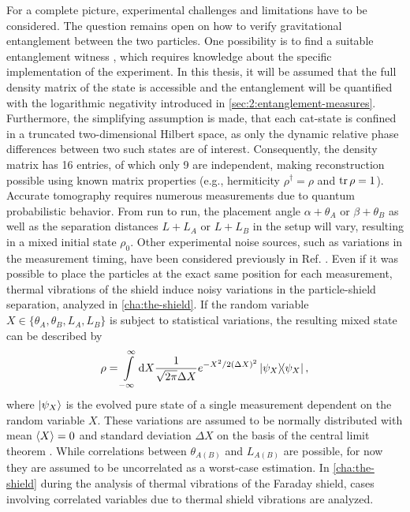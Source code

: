 For a complete picture, experimental challenges and limitations have to be considered. 
The question remains open on how to verify gravitational entanglement between the two particles.
One possibility is to find a suitable entanglement witness \cite{Bose_2017,Chevalier_2020}, which requires knowledge about the specific implementation of the experiment.
In this thesis, it will be assumed that the full density
matrix of the state is accessible and the entanglement will be quantified with the logarithmic negativity introduced in \cref{sec:2:entanglement-measures}.
Furthermore, the simplifying assumption is made, that each cat-state is confined in a truncated two-dimensional Hilbert space, as only the dynamic relative phase differences between two such states are of interest.
Consequently, the density matrix has 16 entries, of which only 9 are independent, making reconstruction possible using known matrix properties (e.g., hermiticity $\rho^\dagger = \rho$ and $\tr \rho = 1$).
Accurate tomography requires numerous measurements due to quantum probabilistic behavior. 
From run to run, the placement angle $\alpha + \theta_A$ or $\beta + \theta_B$ as well as the separation distances $L + L_A$ or $L + L_B$ in the setup will vary, resulting in a mixed initial state $\rho_0$.
Other experimental noise sources, such as variations in the measurement timing, have been considered previously in Ref. \cite{Nguyen_2020}.
Even if it was possible to place the particles at the exact same position for each measurement, thermal vibrations of the shield induce noisy variations in the particle-shield separation, analyzed in \cref{cha:the-shield}.
If the random variable $X \in \{\theta_{A}, \theta_{B}, L_{A}, L_{B}\}$ is subject to statistical variations, the resulting mixed state can be described by
\begin{equation}
  \rho = \int\limits_{-\infty}^{\infty} \dd X \frac{1}{\sqrt{2\pi}\Delta X} e^{-X^2/2(\Delta X)^2} \ketbra{\psi_X} ,
\end{equation}
where $\ket{\psi_X}$ is the evolved pure state of a single measurement dependent on the random variable $X$.
These variations are assumed to be normally distributed with mean $\left\langle X\right\rangle = 0$ and standard deviation $\Delta X$ on the basis of the central limit theorem \cite[p. 1195]{Riley_2018}.
While correlations between $\theta_{A(B)}$ and $L_{A(B)}$ are possible, for now they are assumed to be uncorrelated as a worst-case estimation.
In \cref{cha:the-shield} during the analysis of thermal vibrations of the Faraday shield, cases involving correlated variables due to thermal shield vibrations are analyzed.



